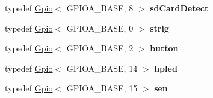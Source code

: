 \begin{DoxyCompactItemize}
\item 
\hypertarget{group___hardware_ga7fd1aeff5d1c25fee0b6c25a31fbe014}{typedef \hyperlink{classmiosix_1_1_gpio}{Gpio}$<$ G\-P\-I\-O\-A\-\_\-\-B\-A\-S\-E, 8 $>$ {\bfseries sd\-Card\-Detect}}\label{group___hardware_ga7fd1aeff5d1c25fee0b6c25a31fbe014}

\item 
\hypertarget{namespacemiosix_a96cd2298b1894b2d63cabab8de952696}{typedef \hyperlink{classmiosix_1_1_gpio}{Gpio}$<$ G\-P\-I\-O\-A\-\_\-\-B\-A\-S\-E, 0 $>$ {\bfseries strig}}\label{namespacemiosix_a96cd2298b1894b2d63cabab8de952696}

\item 
\hypertarget{namespacemiosix_ae28c1e0edcafeb23e5c687782739b02f}{typedef \hyperlink{classmiosix_1_1_gpio}{Gpio}$<$ G\-P\-I\-O\-A\-\_\-\-B\-A\-S\-E, 2 $>$ {\bfseries button}}\label{namespacemiosix_ae28c1e0edcafeb23e5c687782739b02f}

\item 
\hypertarget{namespacemiosix_a914b2233080d564fcfd2663d7181dfbb}{typedef \hyperlink{classmiosix_1_1_gpio}{Gpio}$<$ G\-P\-I\-O\-A\-\_\-\-B\-A\-S\-E, 14 $>$ {\bfseries hpled}}\label{namespacemiosix_a914b2233080d564fcfd2663d7181dfbb}

\item 
\hypertarget{namespacemiosix_a3a08fe96efec690465754203d3bd7f12}{typedef \hyperlink{classmiosix_1_1_gpio}{Gpio}$<$ G\-P\-I\-O\-A\-\_\-\-B\-A\-S\-E, 15 $>$ {\bfseries sen}}\label{namespacemiosix_a3a08fe96efec690465754203d3bd7f12}

\end{DoxyCompactItemize}
